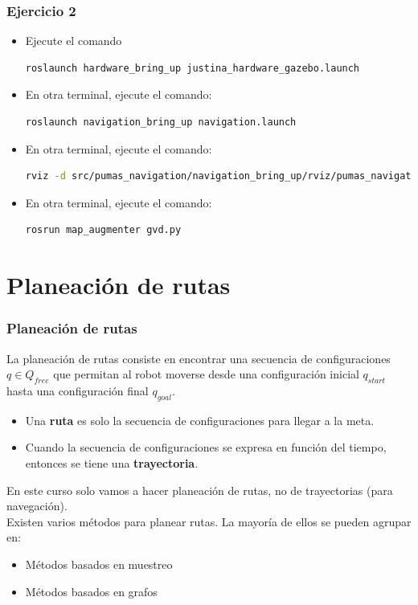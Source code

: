 \begin{frame}[containsverbatim]\frametitle{Ejercicio 2}
  \begin{itemize}
  \item Ejecute el comando
    \begin{lstlisting}[language=bash]
      roslaunch hardware_bring_up justina_hardware_gazebo.launch
    \end{lstlisting}
  \item En otra terminal, ejecute el comando:
    \begin{lstlisting}[language=bash]
      roslaunch navigation_bring_up navigation.launch
    \end{lstlisting}
  \item En otra terminal, ejecute el comando:
    \begin{lstlisting}[language=bash]
    rviz -d src/pumas_navigation/navigation_bring_up/rviz/pumas_navigation.rviz
    \end{lstlisting}
  \item En otra terminal, ejecute el comando:
    \begin{lstlisting}[language=bash]
      rosrun map_augmenter gvd.py
    \end{lstlisting}
  \end{itemize}
\end{frame}

\section{Planeación de rutas}
\begin{frame}\frametitle{Planeación de rutas}
  La planeación de rutas consiste en encontrar una secuencia de configuraciones $q\in Q_{free}$ que permitan al robot moverse desde una configuración inicial $q_{start}$ hasta una configuración final $q_{goal}$.
  \begin{itemize}
  \item Una \textbf{ruta} es solo la secuencia de configuraciones para llegar a la meta.
  \item Cuando la secuencia de configuraciones se expresa en función del tiempo, entonces se tiene una \textbf{trayectoria}. 
  \end{itemize}
  En este curso solo vamos a hacer planeación de rutas, no de trayectorias (para navegación).\\
  Existen varios métodos para planear rutas. La mayoría de ellos se pueden agrupar en:
  \begin{itemize}
  \item Métodos basados en muestreo
  \item Métodos basados en grafos
  \end{itemize}
\end{frame}

